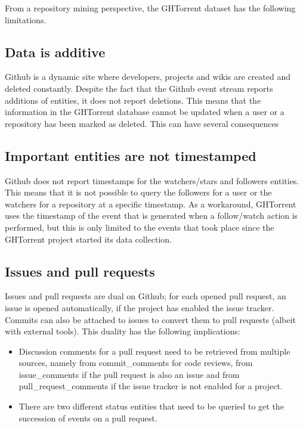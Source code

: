\documentclass[conference]{IEEEtran}
\begin{document}
From a repository mining perspective, the GHTorrent dataset has the following
limitations. 

\subsection{Data is additive} Github is a dynamic site where developers, 
    projects and wikis are created and deleted constantly. Despite the fact
    that the Github event stream reports additions of entities, it does
    not report deletions. This means that the information in the GHTorrent 
    database cannot be updated when a user or a repository has been marked
    as deleted. This can have several consequences 

\subsection{Important entities are not timestamped}
\label{chal:timestamp}
Github does not report
    timestamps for the watchers/stars and followers entities. This means that it
    is not possible to query the followers for a user or the watchers for a
    repository at a specific timestamp. As a workaround, GHTorrent uses the
    timestamp of the event that is generated when a follow/watch action is
    performed, but this is only limited to the events that took place since
    the GHTorrent project started its data collection.


\subsection{Issues and pull requests} Issues and pull requests are dual on
    Github; for each opened pull request, an issue is opened automatically, if
    the project has enabled the issue tracker. Commits can also be attached to
    issues to convert them to pull requests (albeit with external tools). This
    duality has the following implications: 

    \begin{itemize}

      \item Discussion comments for a pull request need to be retrieved from
        multiple sources, namely from {\sf commit\_comments} for code reviews,
        from {\sf issue\_comments} if the pull request is also an issue and 
        from {\sf pull\_request\_comments} if the issue tracker is not enabled
        for a project.

      \item There are two different status entities that need to be queried to
        get the succession of events on a pull request.

    \end{itemize}
\end{document}
